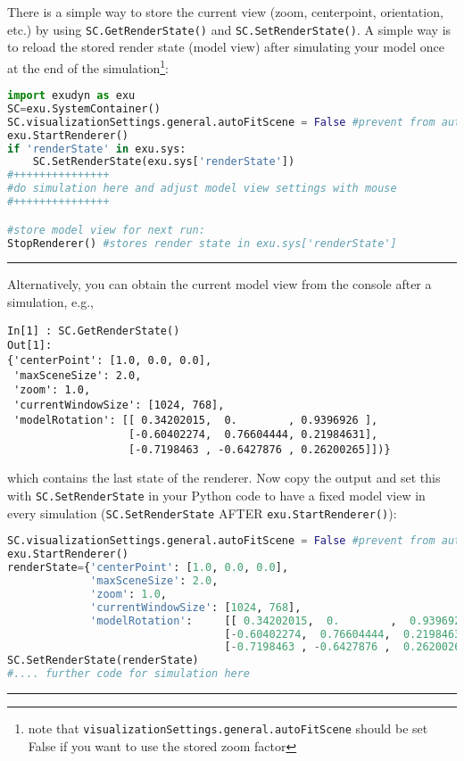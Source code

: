 \label{sec:storing:modelview}
There is a simple way to store the current view (zoom, centerpoint, orientation, etc.) by using \texttt{SC.GetRenderState()} and \texttt{SC.SetRenderState()}.
%
A simple way is to reload the stored render state (model view) after simulating your model once at the end of the simulation\footnote{
note that \texttt{visualizationSettings.general.autoFitScene} should be set False if you want to use the stored zoom factor}:
\pythonstyle
\begin{lstlisting}[language=Python, firstnumber=1]
import exudyn as exu
SC=exu.SystemContainer()
SC.visualizationSettings.general.autoFitScene = False #prevent from autozoom
exu.StartRenderer()
if 'renderState' in exu.sys:
    SC.SetRenderState(exu.sys['renderState']) 
#+++++++++++++++
#do simulation here and adjust model view settings with mouse
#+++++++++++++++

#store model view for next run:
StopRenderer() #stores render state in exu.sys['renderState']
\end{lstlisting}
\par\noindent\rule{\textwidth}{0.4pt}
%
Alternatively, you can obtain the current model view from the console after a simulation, e.g.,
\pythonstyle
\begin{lstlisting}
In[1] : SC.GetRenderState()
Out[1]: 
{'centerPoint': [1.0, 0.0, 0.0],
 'maxSceneSize': 2.0,
 'zoom': 1.0,
 'currentWindowSize': [1024, 768],
 'modelRotation': [[ 0.34202015,  0.        , 0.9396926 ],
                   [-0.60402274,  0.76604444, 0.21984631],
                   [-0.7198463 , -0.6427876 , 0.26200265]])}
\end{lstlisting}
%
which contains the last state of the renderer.
Now copy the output and set this with \texttt{SC.SetRenderState} in your Python code to have a fixed model view in every simulation (\texttt{SC.SetRenderState} AFTER \texttt{exu.StartRenderer()}):
\pythonstyle
\begin{lstlisting}[language=Python, firstnumber=1]
SC.visualizationSettings.general.autoFitScene = False #prevent from autozoom
exu.StartRenderer()
renderState={'centerPoint': [1.0, 0.0, 0.0],
             'maxSceneSize': 2.0,
             'zoom': 1.0,
             'currentWindowSize': [1024, 768],
             'modelRotation':     [[ 0.34202015,  0.        ,  0.9396926 ],
                                  [-0.60402274,  0.76604444,  0.21984631],
                                  [-0.7198463 , -0.6427876 ,  0.26200265]])
SC.SetRenderState(renderState)
#.... further code for simulation here
\end{lstlisting}
\par\noindent\rule{\textwidth}{0.4pt}
%
%

